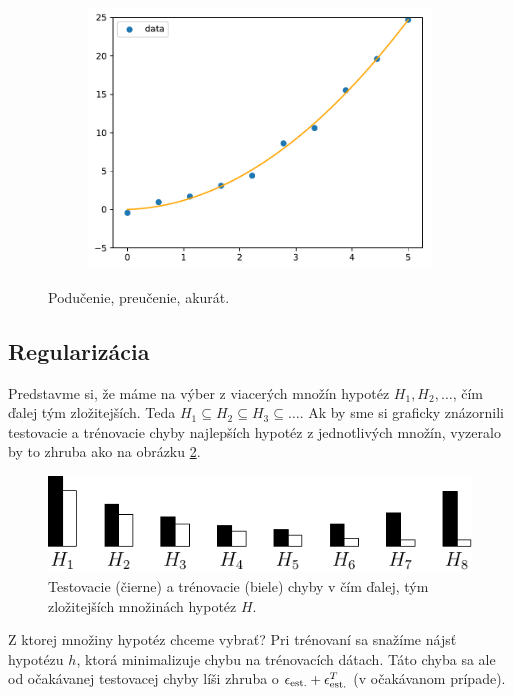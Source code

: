 \begin{figure}
\begin{subfigure}[b]{0.3\textwidth}
    \includegraphics[width=\linewidth]{obrazky/fitting2.pdf}
  \end{subfigure}
  \caption{Podučenie, preučenie, akurát.}
  \label{img:fitting}
\end{figure}


\subsection{Regularizácia}

Predstavme si, že máme na výber z viacerých množín hypotéz $H_1, H_2, \ldots$,
čím ďalej tým zložitejších. Teda $H_1 \subseteq H_2 \subseteq H_3 \subseteq \ldots$.
Ak by sme si graficky znázornili testovacie a trénovacie chyby najlepších
hypotéz z jednotlivých množín, vyzeralo by to zhruba ako na obrázku
\ref{img:multimodels}.

\begin{figure}
  \centering
  \includegraphics[scale=1]{obrazky/multimodels.pdf}
  \caption{Testovacie (čierne) a trénovacie (biele) chyby v čím ďalej,
    tým zložitejších množinách hypotéz $H$.}
  \label{img:multimodels}
\end{figure}

Z ktorej množiny hypotéz chceme vybrať? Pri trénovaní sa snažíme nájsť
hypotézu $h$, ktorá minimalizuje chybu na trénovacích dátach. Táto
chyba sa ale od očakávanej testovacej chyby líši zhruba
o ${\epsilon_\text{est.}} + {\epsilon^T_\text{est.}}$ (v očakávanom prípade).

